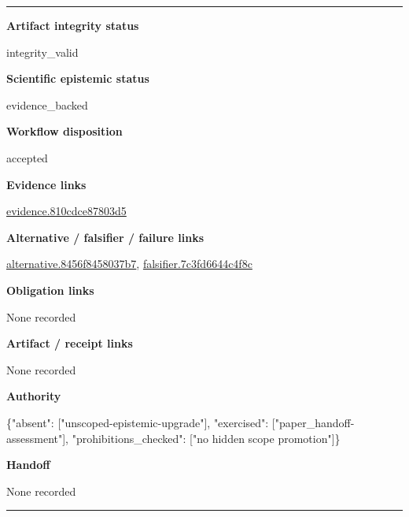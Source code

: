 \documentclass[10pt,a4paper]{article}
\newcommand{\TraceField}[2]{\par\noindent\textbf{#1}\par\noindent #2\par\smallskip}
\newenvironment{TraceDossier}{\par\medskip\noindent\hrule\medskip}{\medskip\hrule\par\medskip}
\begin{document}
\begin{TraceDossier}
\TraceField{Artifact integrity status}{integrity\_\allowbreak{}valid}

\TraceField{Scientific epistemic status}{evidence\_\allowbreak{}backed}

\TraceField{Workflow disposition}{accepted}

\TraceField{Evidence links}{\hyperlink{trace-evidence-0e70798ece5694b252}{evidence.\allowbreak{}810cdce878\allowbreak{}03d5}}

\TraceField{Alternative / falsifier / failure links}{\hyperlink{trace-alternative-fbc278b68e92adaf3d}{alternativ\allowbreak{}e.\allowbreak{}8456f84580\allowbreak{}37b7}, \hyperlink{trace-alternative-cbbd7d788b1424a35d}{falsifier.\allowbreak{}7c3fd6644c\allowbreak{}4f8c}}

\TraceField{Obligation links}{None recorded}

\TraceField{Artifact / receipt links}{None recorded}

\TraceField{Authority}{\{"absent":\allowbreak{} ["unscoped\allowbreak{}-\allowbreak{}epistemic-\allowbreak{}upgrade"],\allowbreak{} "exercised\allowbreak{}":\allowbreak{} ["paper\_\allowbreak{}handoff-\allowbreak{}assessment\allowbreak{}"], "prohibiti\allowbreak{}ons\_\allowbreak{}checked":\allowbreak{} ["no hidden scope promotion"\allowbreak{}]\}}

\TraceField{Handoff}{None recorded}

\end{TraceDossier}
\end{document}
